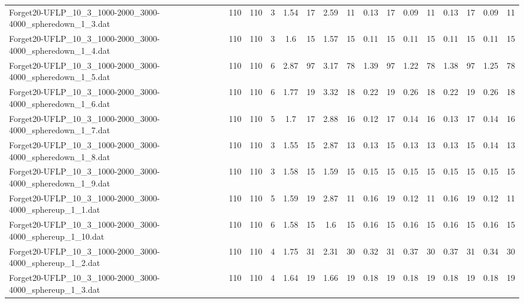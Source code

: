 \begin{sidewaystable}[!ht]
{\begin{tabular}{lccccccccccccccc}
Forget20-UFLP\_10\_3\_1000-2000\_3000-4000\_spheredown\_1\_3.dat & 110 & 110 & 3 & 1.54 & 17 & 2.59 & 11 & 0.13 & 17 &  \textcolor{blue2}{0.09} & 11 & 0.13 & 17 &  \textcolor{blue2}{0.09} & 11 \\
Forget20-UFLP\_10\_3\_1000-2000\_3000-4000\_spheredown\_1\_4.dat & 110 & 110 & 3 & 1.6 & 15 & 1.57 & 15 &  \textcolor{blue2}{0.11} & 15 &  \textcolor{blue2}{0.11} & 15 &  \textcolor{blue2}{0.11} & 15 &  \textcolor{blue2}{0.11} & 15 \\
Forget20-UFLP\_10\_3\_1000-2000\_3000-4000\_spheredown\_1\_5.dat & 110 & 110 & 6 & 2.87 & 97 & 3.17 & 78 & 1.39 & 97 & 1.22 & 78 & 1.38 & 97 & 1.25 & 78 \\
Forget20-UFLP\_10\_3\_1000-2000\_3000-4000\_spheredown\_1\_6.dat & 110 & 110 & 6 & 1.77 & 19 & 3.32 & 18 &  \textcolor{blue2}{0.22} & 19 & 0.26 & 18 &  \textcolor{blue2}{0.22} & 19 & 0.26 & 18 \\
Forget20-UFLP\_10\_3\_1000-2000\_3000-4000\_spheredown\_1\_7.dat & 110 & 110 & 5 & 1.7 & 17 & 2.88 & 16 &  \textcolor{blue2}{0.12} & 17 & 0.14 & 16 & 0.13 & 17 & 0.14 & 16 \\
Forget20-UFLP\_10\_3\_1000-2000\_3000-4000\_spheredown\_1\_8.dat & 110 & 110 & 3 & 1.55 & 15 & 2.87 & 13 &  \textcolor{blue2}{0.13} & 15 &  \textcolor{blue2}{0.13} & 13 &  \textcolor{blue2}{0.13} & 15 & 0.14 & 13 \\
Forget20-UFLP\_10\_3\_1000-2000\_3000-4000\_spheredown\_1\_9.dat & 110 & 110 & 3 & 1.58 & 15 & 1.59 & 15 &  \textcolor{blue2}{0.15} & 15 &  \textcolor{blue2}{0.15} & 15 &  \textcolor{blue2}{0.15} & 15 &  \textcolor{blue2}{0.15} & 15 \\
Forget20-UFLP\_10\_3\_1000-2000\_3000-4000\_sphereup\_1\_1.dat & 110 & 110 & 5 & 1.59 & 19 & 2.87 & 11 & 0.16 & 19 &  \textcolor{blue2}{0.12} & 11 & 0.16 & 19 &  \textcolor{blue2}{0.12} & 11 \\
Forget20-UFLP\_10\_3\_1000-2000\_3000-4000\_sphereup\_1\_10.dat & 110 & 110 & 6 & 1.58 & 15 & 1.6 & 15 &  \textcolor{blue2}{0.16} & 15 &  \textcolor{blue2}{0.16} & 15 &  \textcolor{blue2}{0.16} & 15 &  \textcolor{blue2}{0.16} & 15 \\
Forget20-UFLP\_10\_3\_1000-2000\_3000-4000\_sphereup\_1\_2.dat & 110 & 110 & 4 & 1.75 & 31 & 2.31 & 30 &  \textcolor{blue2}{0.32} & 31 & 0.37 & 30 & 0.37 & 31 & 0.34 & 30 \\
Forget20-UFLP\_10\_3\_1000-2000\_3000-4000\_sphereup\_1\_3.dat & 110 & 110 & 4 & 1.64 & 19 & 1.66 & 19 &  \textcolor{blue2}{0.18} & 19 &  \textcolor{blue2}{0.18} & 19 &  \textcolor{blue2}{0.18} & 19 &  \textcolor{blue2}{0.18} & 19 \\

\end{tabular}}
\end{sidewaystable}
